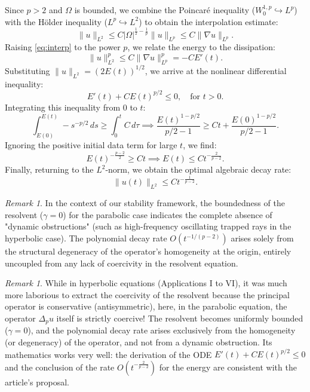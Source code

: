 \documentclass[11pt,reqno]{amsart}
\theoremstyle{remark}
\newtheorem{remark}[theorem]{Remark}
\begin{document}
Since $p > 2$ and $\Omega$ is bounded, we combine the Poincaré inequality ($W_0^{1,p} \hookrightarrow L^p$) with the Hölder inequality ($L^p \hookrightarrow L^2$) to obtain the interpolation estimate:
\begin{equation} \label{eq:interp}
    \|u\|_{L^2} \le C |\Omega|^{\frac{1}{2} - \frac{1}{p}} \|u\|_{L^p} \le C \|\nabla u\|_{L^p}.
\end{equation}
Raising \eqref{eq:interp} to the power $p$, we relate the energy to the dissipation:
\[
    \|u\|_{L^2}^p \le C \|\nabla u\|_{L^p}^p = -C E'(t).
\]
Substituting $\|u\|_{L^2} = (2E(t))^{1/2}$, we arrive at the nonlinear differential inequality:
\begin{equation} \label{eq:diff_ineq}
    E'(t) + C E(t)^{p/2} \le 0, \quad \text{for } t > 0.
\end{equation}
Integrating this inequality from $0$ to $t$:
\[
    \int_{E(0)}^{E(t)} -s^{-p/2} \, ds \ge \int_0^t C \, d\tau \implies \frac{E(t)^{1-p/2}}{p/2 - 1} \ge Ct + \frac{E(0)^{1-p/2}}{p/2 - 1}.
\]
Ignoring the positive initial data term for large $t$, we find:
\[
    E(t)^{-\frac{p-2}{2}} \ge C t \implies E(t) \le C t^{-\frac{2}{p-2}}.
\]
Finally, returning to the $L^2$-norm, we obtain the optimal algebraic decay rate:
\begin{equation}
    \|u(t)\|_{L^2} \le C t^{-\frac{1}{p-2}}.
\end{equation}

\begin{remark}
In the context of our stability framework, the boundedness of the resolvent ($\gamma = 0$) for the parabolic case indicates the complete absence of "dynamic obstructions" (such as high-frequency oscillating trapped rays in the hyperbolic case). The polynomial decay rate $O(t^{-1/(p-2)})$ arises solely from the structural degeneracy of the operator's homogeneity at the origin, entirely uncoupled from any lack of coercivity in the resolvent equation.
\end{remark}

\begin{remark}
While in hyperbolic equations (Applications I to VI), it was much more laborious to extract the coercivity of the resolvent because the principal operator is conservative (antisymmetric), here, in the parabolic equation, the operator $\Delta_p u$ itself is strictly coercive! The resolvent becomes uniformly bounded ($\gamma = 0$), and the polynomial decay rate arises exclusively from the homogeneity (or degeneracy) of the operator, and not from a dynamic obstruction. Its mathematics works very well: the derivation of the ODE $E'(t) + C E(t)^{p/2} \le 0$ and the conclusion of the rate $O(t^{-\frac{2}{p-2}})$ for the energy are consistent with the article's proposal.
\end{remark}
\end{document}
